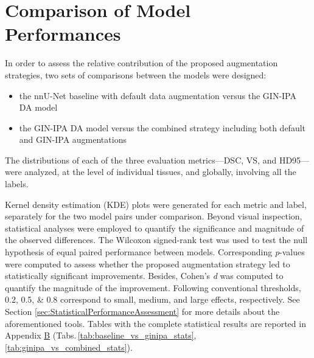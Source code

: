 \section{Comparison of Model Performances} \label{sec:ComparisonOfModelPerformances}
In order to assess the relative contribution of the proposed augmentation strategies, two sets of comparisons between the models were designed:
\begin{itemize}
  \item the nnU-Net baseline with default data augmentation versus the GIN-IPA DA model
  \item the GIN-IPA DA model versus the combined strategy including both default and GIN-IPA augmentations
\end{itemize}
The distributions of each of the three evaluation metrics---DSC, VS, and HD95---were analyzed, at the level of individual tissues, and globally, involving all the labels.

Kernel density estimation (KDE) plots were generated for each metric and label, separately for the two model pairs under comparison. Beyond visual inspection, statistical analyses were employed to quantify the significance and magnitude of the observed differences. The Wilcoxon signed-rank test was used to test the null hypothesis of equal paired performance between models. Corresponding \textit{p}-values were computed to assess whether the proposed augmentation strategy led to statistically significant improvements. Besides, Cohen's \textit{d} was computed to quantify the magnitude of the improvement. Following conventional thresholds, \numlist{0.2; 0.5; 0.8} correspond to small, medium, and large effects, respectively. See Section \ref{sec:StatisticalPerformanceAssessment} for more details about the aforementioned tools. Tables with the complete statistical results are reported in Appendix \hyperref[app:SupplementaryTables]{B} (Tabs.\,\ref{tab:baseline_vs_ginipa_stats}, \ref{tab:ginipa_vs_combined_stats}).

